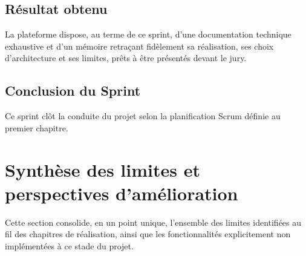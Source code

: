 \subsection{Résultat obtenu}

La plateforme dispose, au terme de ce sprint, d'une documentation technique exhaustive et d'un mémoire retraçant fidèlement sa réalisation, ses choix d'architecture et ses limites, prêts à être présentés devant le jury.

\subsection{Conclusion du Sprint}

Ce sprint clôt la conduite du projet selon la planification Scrum définie au premier chapitre.


\section{Synthèse des limites et perspectives d'amélioration}

Cette section consolide, en un point unique, l'ensemble des limites identifiées au fil des chapitres de réalisation, ainsi que les fonctionnalités explicitement non implémentées à ce stade du projet.

